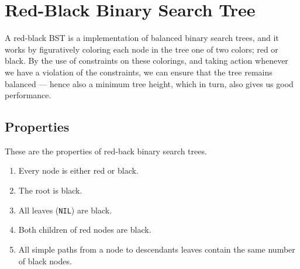 
\newpage
\section{Red-Black Binary Search Tree}
A red-black BST is a implementation of balanced binary search trees, and it
works by figuratively coloring each node in the tree one of two colors; red or
black. By the use of constraints on these colorings, and taking action
whenever we have a violation of the constraints, we can ensure that the tree
remains balanced --- hence also a minimum tree height, which in turn, also
gives us good performance.

\subsection{Properties}
These are the properties of red-back binary search trees.
\begin{enumerate}
	\item Every node is either red or black.
	\item The root is black.
	\item All leaves (\texttt{NIL}) are black.
	\item Both children of red nodes are black.
	\item All simple paths from a node to descendants leaves contain the same
number of black nodes.
\end{enumerate}


